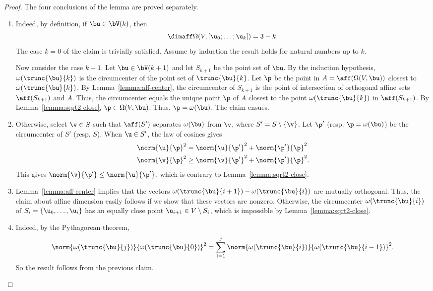 \begin{proof} The four conclusions of the lemma  are proved
separately.

\begin{enumerate}
\item {}
  Indeed, by definition, if $\bu\in \bV(k)$, then
\[  
\dimaff\Omega(V,[\u_0;\ldots;\u_k]) = 3-k.
\]   
The case $k=0$ of the claim is trivially satisfied.  Assume by
induction the result holds for natural numbers up to $k$.

Now consider the case $k+1$.  Let $\bu\in \bV(k+1)$ and let $S_{k+1}$ be the
point set of $\bu$.  By the induction hypothesis,
$\omega(\trunc{\bu}{k})$ is the circumcenter of the point set of
$\trunc{\bu}{k}$.  Let $\p$ be the point in $A=\aff(\Omega(V,\bu))$
closest to $\omega(\trunc{\bu}{k})$.  By Lemma~\ref{lemma:aff-center},
the circumcenter of $S_{k+1}$ is the point of intersection of orthogonal
affine sets $\aff(S_{k+1})$ and $A$.  Thus, the circumcenter equals the
unique point $\p$ of $A$ closest to the point $\omega(\trunc{\bu}{k})$ in
$\aff(S_{k+1})$.  By Lemma~\ref{lemma:sqrt2-close}, $\p\in\Omega(V,\bu)$.
Thus, $\p=\omega(\bu)$.  The claim ensues.

\item{}  Otherwise, select
  $\v\in S$ such that $\aff(S')$ separates $\omega(\bu)$ from $ \v$,
  where $S'=S\setminus\{\v\}$.  Let $\p'$ (resp. $\p=\omega(\bu)$) be
  the circumcenter of $S'$ (resp. $S$).  When $\u\in S'$, the law of
  cosines gives
\begin{align*} 
\norm{ \u}{\p}^2 &= \norm{\u}{\p'}^2 + \norm{\p'}{\p}^2\\ 
\norm{ \v}{\p}^2 &\ge \norm{\v}{\p'}^2 + \norm{\p'}{\p}^2.
\end{align*}
This gives $\norm{\v}{\p'}\le \norm{\u}{\p'}$, which is contrary to
Lemma~\ref{lemma:sqrt2-close}.

\item{}
  Lemma~\ref{lemma:aff-center} implies that the vectors
  ${\omega(\trunc{\bu}{i+1})}-{\omega(\trunc{\bu}{i})}$ are mutually
  orthogonal.  Thus, the claim about affine dimension easily follows
  if we show that these vectors are nonzero.
Otherwise, the
circumcenter $\omega(\trunc{\bu}{i})$ of $S_i=\{\u_0,\ldots,\u_i\}$
has an equally close point $ \u_{i+1}\in V\setminus S_i$, which is
impossible by Lemma~\ref{lemma:sqrt2-close}.

\item{}  
Indeed, by the Pythagorean theorem,
\begin{equation} 
\norm{\omega(\trunc{\bu}{j})}{\omega(\trunc{\bu}{0})}^2 =
\sum_{i=1}^{j} \norm{\omega(\trunc{\bu}{i})}{\omega(\trunc{\bu}{i-1})}^2.
\end{equation}
So the result follows from the
previous claim.
\end{enumerate}
\end{proof}


